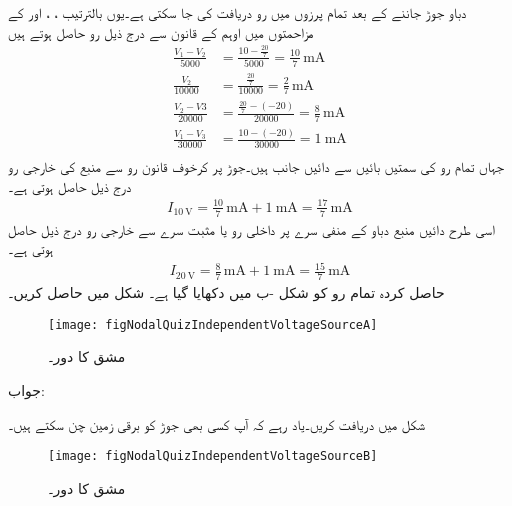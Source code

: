 دباو جوڑ جاننے کے بعد تمام پرزوں میں رو دریافت کی جا سکتی ہے۔یوں بالترتیب  ، ،  اور  کے مزاحمتوں میں اوہم کے قانون سے درج ذیل رو حاصل ہوتے ہیں
\begin{align*}
\frac{V_1-V_2}{5000}&=\frac{10-\frac{20}{7}}{5000}=\frac{10}{7} \,\si{\milli\ampere}\\
\frac{V_2}{10000}&=\frac{\frac{20}{7}}{10000}=\frac{2}{7} \,\si{\milli\ampere}\\
\frac{V_2-V3}{20000}&=\frac{\frac{20}{7}-(-20)}{20000}=\frac{8}{7} \,\si{\milli\ampere}\\
\frac{V_1-V_3}{30000}&=\frac{10-(-20)}{30000}=\SI{1}{\milli\ampere}\\
\end{align*}
جہاں تمام رو کی سمتیں بائیں سے دائیں جانب ہیں۔جوڑ  پر کرخوف قانون رو سے  منبع کی خارجی رو درج ذیل حاصل ہوتی ہے۔
\begin{align*}
I_{\SI{10}{\volt}}=\frac{10}{7} \,\si{\milli\ampere}+\SI{1}{\milli\ampere}=\frac{17}{7} \,\si{\milli\ampere}
\end{align*}
اسی طرح دائیں منبع دباو کے منفی سرے پر داخلی رو یا مثبت سرے سے خارجی رو درج ذیل حاصل ہوتی ہے۔
\begin{align*}
I_{\SI{20}{\volt}}=\frac{8}{7} \,\si{\milli\ampere}+\SI{1}{\milli\ampere}=\frac{15}{7} \,\si{\milli\ampere}
\end{align*}
حاصل کردہ تمام رو کو شکل -ب میں دکھایا گیا ہے۔
شکل  میں  حاصل کریں۔
\begin{figure}
\centering
\texttt{[image: figNodalQuizIndependentVoltageSourceA]}
\caption{مشق  کا دور۔}
\label{شکل_جوڑ_مشق_غیر_تابع_منبع_دباو_الف}
\end{figure}%

جواب:


شکل  میں  دریافت کریں۔یاد رہے کہ آپ کسی بھی جوڑ کو برقی زمین چن سکتے ہیں۔
\begin{figure}
\centering
\texttt{[image: figNodalQuizIndependentVoltageSourceB]}
\caption{مشق  کا دور۔}
\label{شکل_جوڑ_مشق_غیر_تابع_منبع_دباو_ب}
\end{figure}%

